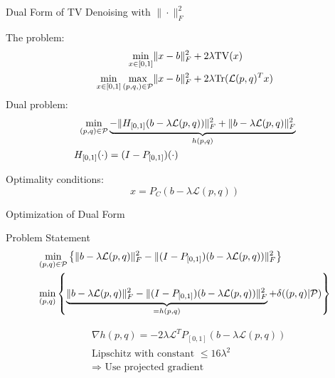 \documentclass[12pt]{beamer}
\DeclarePairedDelimiter{\norm}{\lVert}{\rVert}
\begin{document}
\begin{frame}{Dual Form of TV Denoising with $\|\cdot \|_F^2$}

The problem:
\begin{align*}
\min_{x \in [0,1]} &\norm{x - b}_F^2 + 2 \lambda \mathrm{TV}(x) \\
\min_{x \in [0,1]} \max_{(p,q,) \in \mathcal{P}} &\norm{x - b}_F^2 + 2 \lambda \mathrm{Tr} ( \mathcal{L}(p,q)^T x )
\end{align*}
Dual problem: 
\begin{align*}
\min_{(p,q) \in \mathcal{P} } & \underbrace{- \norm{ H_{[0,1]} (b- \lambda \mathcal{L}(p,q) ) }_F^2 + \norm{ b - \lambda \mathcal{L}(p,q) }_F^2}_{h(p,q)} \\
H_{[0,1]}(\cdot ) & = (I - P_{[0,1]})(\cdot )
\end{align*}

Optimality conditions: 
$$ x = P_C(b - \lambda \mathcal{L}(p,q) )$$

\end{frame}

\begin{frame}{Optimization of Dual Form}

\begin{exampleblock}{Problem Statement}
\vspace{-5 mm}
\begin{align*}
&\underset{(p,q) \in \mathcal{P} }{\text{min}}  \left\{  \norm{b - \lambda \mathcal{L} (p,q)}_F^2 - \norm{(I-P_{[0,1]}) (b - \lambda \mathcal{L} (p,q))}_F^2   \right\}\\
&\underset{(p,q) }{\text{min}}  \left\{  \underbrace{\norm{b - \lambda \mathcal{L} (p,q)}_F^2 - \norm{(I-P_{[0,1]}) (b - \lambda \mathcal{L} (p,q))}_F^2}_{= h(p,q)} + \delta((p,q) | \mathcal{P})   \right\}
\end{align*}
\end{exampleblock}

\begin{exampleblock}{}
\begin{align*}
&\nabla h (p,q) = -2\lambda \mathcal{L}^TP_{[0,1]} (b - \lambda \mathcal{L}(p,q)) \\
&\text{Lipschitz with constant } \leq 16\lambda^2\\
&\Rightarrow \text{ Use projected gradient}
\end{align*}
\end{exampleblock}

\end{frame}
\end{document}
